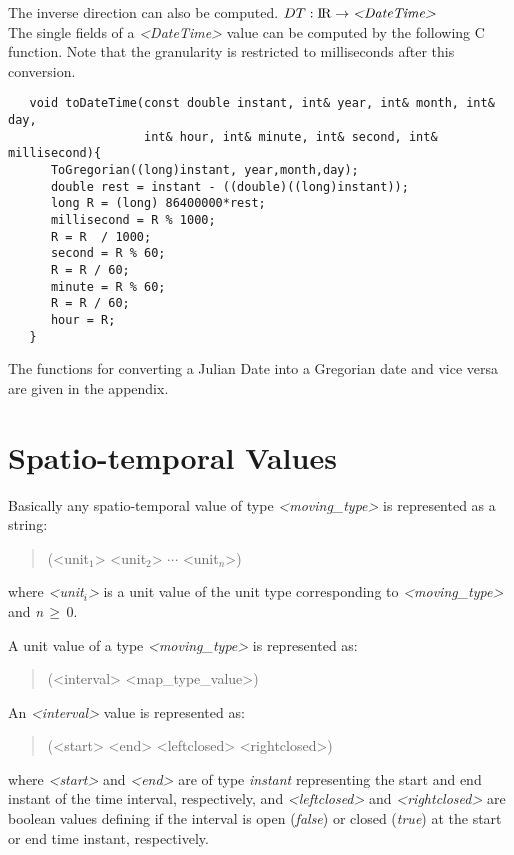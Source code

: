 \documentclass[english,a4paper]{article}
\newcommand{\R}{\ensuremath{\mbox{I\hspace*{-0.1em}R}}}
\begin{document}
The inverse direction can also be computed.
$ DT : \R \rightarrow \mbox{\emph{<DateTime>}}$\\
The single fields of a \emph{<DateTime>} value can be computed by the following C function.
Note that the granularity is restricted to milliseconds after this conversion.
\begin{footnotesize}
\begin{verbatim}
   void toDateTime(const double instant, int& year, int& month, int& day,
                   int& hour, int& minute, int& second, int& millisecond){
      ToGregorian((long)instant, year,month,day);
      double rest = instant - ((double)((long)instant));
      long R = (long) 86400000*rest;
      millisecond = R % 1000;
      R = R  / 1000;
      second = R % 60;
      R = R / 60;
      minute = R % 60;
      R = R / 60;
      hour = R;
   }
\end{verbatim}
\end{footnotesize}

The functions for converting a Julian Date into a Gregorian date and vice versa are
given in the appendix.

\section{Spatio-temporal Values}

Basically any spatio-temporal value of type \emph{<moving\_type>}
is represented as a string:

\begin{quotation}
(<unit$_{1}$> <unit$_{2}$> $\cdots $ <unit$_{n}$>)
\end{quotation}
where \emph{<unit$_{i}$>} is a unit value of the unit type corresponding
to \emph{<moving\_type>} and \emph{n}$\, \geq \, $0.

A unit value of a type \emph{<moving\_type>} is represented as:

\begin{quotation}
(<interval> <map\_type\_value>)
\end{quotation}

An \emph{<interval>} value is represented as:

\begin{quotation}
(<start> <end> <leftclosed> <rightclosed>)
\end{quotation}
where \emph{<start>} and \emph{<end>} are of type \emph{instant}
representing the start and end instant of the time interval, respectively, and
\emph{<leftclosed>} and \emph{<rightclosed>} are boolean values defining
if the interval is open (\emph{false}) or closed (\emph{true}) at
the start or end time instant, respectively.
\end{document}
